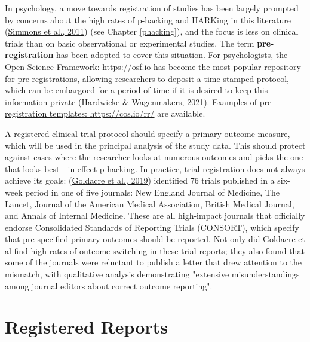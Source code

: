 \documentclass{krantz}
\begin{document}
In psychology, a move towards registration of studies has been largely prompted by concerns about the high rates of p-hacking and HARKing in this literature (\protect\hyperlink{ref-simmons2011}{Simmons et al., 2011}) (see Chapter \ref{phacking}), and the focus is less on clinical trials than on basic observational or experimental studies. The term \textbf{pre-registration} has been adopted to cover this situation. For psychologists, the \href{https://osf.io}{Open Science Framework: https://osf.io} has become the most popular repository for pre-registrations, allowing researchers to deposit a time-stamped protocol, which can be embargoed for a period of time if it is desired to keep this information private (\protect\hyperlink{ref-hardwicke2021}{Hardwicke \& Wagenmakers, 2021}). Examples of \href{https://cos.io/rr/}{pre-registration templates: https://cos.io/rr/} are available.

\begin{tcolorbox}[colback=Black!5!lightgray,colframe=black!75!black,coltitle=white,title=Does trial registration prevent outcome-switching?]\label{box:switch}
A registered clinical trial protocol should specify a primary outcome measure, which will be used in the principal analysis of the study data. This should protect against cases where the researcher looks at numerous outcomes and picks the one that looks best - in effect p-hacking. In practice, trial registration does not always achieve its goals: (\protect\hyperlink{ref-goldacre2019}{Goldacre et al., 2019}) identified 76 trials published in a six-week period in one of five journals: New England Journal of Medicine, The Lancet, Journal of the American Medical Association, British Medical Journal, and Annals of Internal Medicine. These are all high-impact journals that officially endorse Consolidated Standards of Reporting Trials (CONSORT), which specify that pre-specified primary outcomes should be reported. Not only did Goldacre et al find high rates of outcome-switching in these trial reports; they also found that some of the journals were reluctant to publish a letter that drew attention to the mismatch, with qualitative analysis demonstrating "extensive misunderstandings among journal editors about correct outcome reporting".
\end{tcolorbox}

\hypertarget{registered-reports}{%
\section{Registered Reports}\label{registered-reports}}
\end{document}
